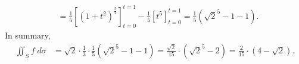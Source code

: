 \documentclass[11pt]{article}
\begin{document}
\begin{solution}
\begin{align*}
        \\&
        =
        \frac 1 5
        \left[ \left( 1 + t^2 \right)^{\frac 5 2} \right]_{t=0}^{t=1}
        -
        \frac 1 5
        \left[ t^5 \right]_{t=0}^{t=1}
        =
        \frac 1 5 \left( \sqrt{2}^{5} - 1 - 1 \right)
        .
    \end{align*}
    In summary, 
    \begin{align*}
        \iint_S f \;d\sigma
        &=
        \sqrt{2}
        \cdot 
        \frac 1 3 
        \cdot 
        \frac 1 5 \left( \sqrt{2}^{5} - 1 - 1 \right)
        =
        \frac{\sqrt 2}{15}
        \cdot 
        \left( \sqrt{2}^{5} - 2 \right)
        =
        \frac{2}{15}
        \cdot 
        \left( 4 - \sqrt 2 \right)
        .
    \end{align*}
\end{solution}
\end{document}
